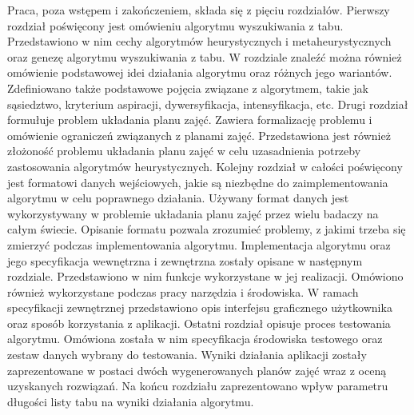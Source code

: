 Praca, poza wstępem i zakończeniem, składa się z pięciu rozdziałów. Pierwszy rozdział poświęcony jest omówieniu algorytmu wyszukiwania z tabu. Przedstawiono w nim cechy algorytmów heurystycznych i metaheurystycznych oraz genezę algorytmu wyszukiwania z tabu. W rozdziale znaleźć można również omówienie podstawowej idei działania algorytmu oraz różnych jego wariantów. Zdefiniowano także podstawowe pojęcia związane z algorytmem, takie jak sąsiedztwo, kryterium aspiracji, dywersyfikacja, intensyfikacja, etc. Drugi rozdział formułuje problem układania planu zajęć. Zawiera formalizację problemu i omówienie ograniczeń związanych z planami zajęć. Przedstawiona jest również złożoność problemu układania planu zajęć w celu uzasadnienia potrzeby zastosowania algorytmów heurystycznych. Kolejny rozdział w całości poświęcony jest formatowi danych wejściowych, jakie są niezbędne do zaimplementowania algorytmu w celu poprawnego działania. Używany format danych jest wykorzystywany w problemie układania planu zajęć przez wielu badaczy na całym świecie. Opisanie formatu pozwala zrozumieć problemy, z jakimi trzeba się zmierzyć podczas implementowania algorytmu. Implementacja algorytmu oraz jego specyfikacja wewnętrzna i zewnętrzna zostały opisane w następnym rozdziale. Przedstawiono w nim funkcje wykorzystane w jej realizacji. Omówiono również wykorzystane podczas pracy narzędzia i środowiska. W ramach specyfikacji zewnętrznej przedstawiono opis interfejsu graficznego użytkownika oraz sposób korzystania z aplikacji. Ostatni rozdział opisuje proces testowania algorytmu. Omówiona została w nim specyfikacja środowiska testowego oraz zestaw danych wybrany do testowania. Wyniki działania aplikacji zostały zaprezentowane w postaci dwóch wygenerowanych planów zajęć wraz z oceną uzyskanych rozwiązań. Na końcu rozdziału zaprezentowano wpływ parametru długości listy tabu na wyniki działania algorytmu.
